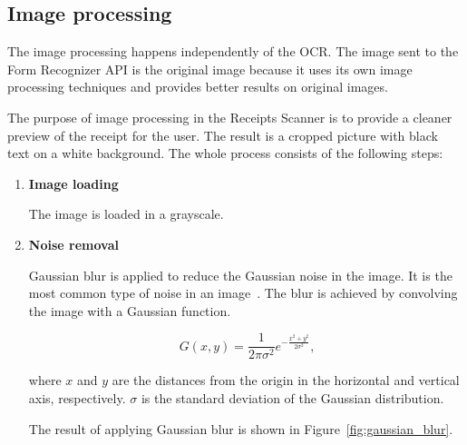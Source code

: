 \documentclass[
  digital, %
  table,   %
  oneside, %
  lof,     %
  lot,     %
]{fithesis3}
\begin{document}
\subsection{Image processing}
The image processing happens independently of the OCR. The image sent to the Form Recognizer API is the original image because it uses its own image processing techniques and provides better results on original images.

The purpose of image processing in the Receipts Scanner is to provide a cleaner preview of the receipt for the user. The result is a cropped picture with black text on a white background. The whole process consists of the following steps:

\begin{enumerate}
    \item \textbf{Image loading} 
    
    The image is loaded in a grayscale.
    
    \item \textbf{Noise removal} 

    Gaussian blur is applied to reduce the Gaussian noise in the image. It is the most common type of noise in an image~\cite{Shreya2019OCRCNN}. The blur is achieved by convolving the image with a Gaussian function.
    
    \begin{equation}
    G(x,y) = \frac{1}{2\pi\sigma^2}e^{-\frac{x^2+y^2}{2\sigma^2}}\text{,}
    \end{equation}
    
    where $x$ and $y$ are the distances from the origin in the horizontal and vertical axis, respectively. $\sigma$ is the standard deviation of the Gaussian distribution.~\cite{Shreya2019OCRCNN}
    
    The result of applying Gaussian blur is shown in Figure~\ref{fig:gaussian_blur}.
    

\end{enumerate}
\end{document}
